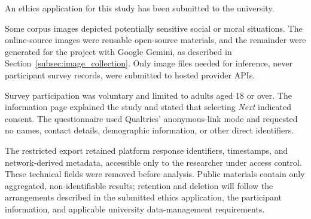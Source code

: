 An ethics application for this study has been submitted to the university.

Some corpus images depicted potentially sensitive social or moral situations.
The online-source images were reusable open-source materials, and the remainder
were generated for the project with Google Gemini, as described in
Section~\ref{subsec:image_collection}. Only image files needed for inference,
never participant survey records, were submitted to hosted provider APIs.

Survey participation was voluntary and limited to adults aged 18 or over. The
information page explained the study and stated that selecting \textit{Next}
indicated consent. The questionnaire used Qualtrics' anonymous-link mode and
requested no names, contact details, demographic information, or other direct
identifiers.

The restricted export retained platform response identifiers, timestamps, and
network-derived metadata, accessible only to the researcher under access
control. These technical fields were removed before analysis. Public materials
contain only aggregated, non-identifiable results; retention and deletion will
follow the arrangements described in the submitted ethics application, the
participant information, and applicable university data-management requirements.
